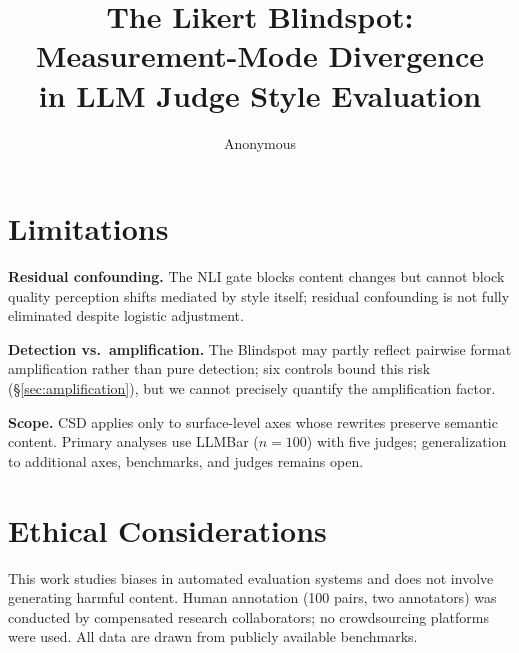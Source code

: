 \documentclass[11pt]{article}
\title{The Likert Blindspot: Measurement-Mode Divergence\\in LLM Judge Style Evaluation}
\author{Anonymous}
\begin{document}
\maketitle













\section*{Limitations}
\label{sec:limitations}

\noindent\textbf{Residual confounding.}
The NLI gate blocks content changes but cannot block quality perception shifts mediated by style itself; residual confounding is not fully eliminated despite logistic adjustment.

\noindent\textbf{Detection vs.\ amplification.}
The Blindspot may partly reflect pairwise format amplification \citep{jeong2025comparative} rather than pure detection; six controls bound this risk (\S\ref{sec:amplification}), but we cannot precisely quantify the amplification factor.

\noindent\textbf{Scope.}
CSD applies only to surface-level axes whose rewrites preserve semantic content. Primary analyses use LLMBar ($n = 100$) with five judges; generalization to additional axes, benchmarks, and judges remains open.

\section*{Ethical Considerations}

This work studies biases in automated evaluation systems and does not involve generating harmful content. Human annotation (100 pairs, two annotators) was conducted by compensated research collaborators; no crowdsourcing platforms were used. All data are drawn from publicly available benchmarks.




\end{document}
